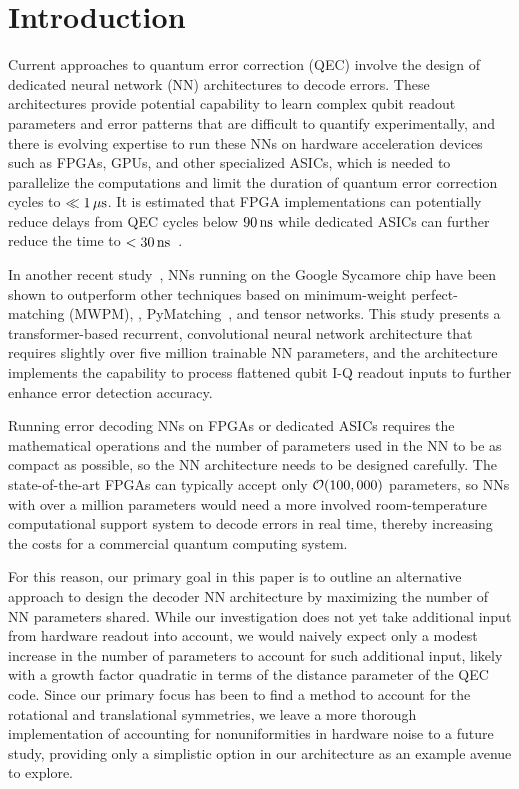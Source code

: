 \section{Introduction}

Current approaches to quantum error correction (QEC) involve the design of dedicated neural network (NN) architectures to decode errors. These architectures provide potential capability to learn complex qubit readout parameters and error patterns that are difficult to quantify experimentally, and there is evolving expertise to run these NNs on hardware acceleration devices such as FPGAs, GPUs, and other specialized ASICs, which is needed to parallelize the computations and limit the duration of quantum error correction cycles to $\ll 1\,\mu\text{s}$. It is estimated that FPGA implementations can potentially reduce delays from QEC cycles below $90\,\text{ns}$ while dedicated ASICs can further reduce the time to $<30\,\text{ns}$~\cite{Overwater:2022qwb}.

In another recent study~\cite{Bausch:2023jgi}, NNs running on the Google Sycamore chip have been shown to outperform other techniques based on minimum-weight perfect-matching (MWPM), \eg, PyMatching~\cite{Higgott:2023}, and tensor networks. This study presents a transformer-based recurrent, convolutional neural network architecture that requires slightly over five million trainable NN parameters, and the architecture implements the capability to process flattened qubit I-Q readout inputs to further enhance error detection accuracy.

Running error decoding NNs on FPGAs or dedicated ASICs requires the mathematical operations and the number of parameters used in the NN to be as compact as possible, so the NN architecture needs to be designed carefully. The state-of-the-art FPGAs can typically accept only $\mathcal{O}(100,000)$ parameters, so NNs with over a million parameters would need a more involved room-temperature computational support system to decode errors in real time, thereby increasing the costs for a commercial quantum computing system.

For this reason, our primary goal in this paper is to outline an alternative approach to design the decoder NN architecture by maximizing the number of NN parameters shared. While our investigation does not yet take additional input from hardware readout into account, we would naively expect only a modest increase in the number of parameters to account for such additional input, likely with a growth factor quadratic in terms of the distance parameter of the QEC code. Since our primary focus has been to find a method to account for the rotational and translational symmetries, we leave a more thorough implementation of accounting for nonuniformities in hardware noise to a future study, providing only a simplistic option in our architecture as an example avenue to explore.

